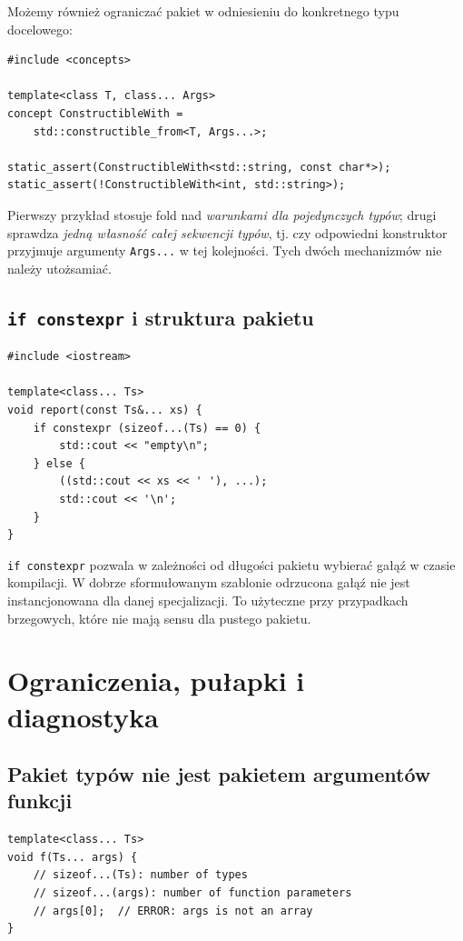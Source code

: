 Możemy również ograniczać pakiet w odniesieniu do
konkretnego typu docelowego:

\begin{lstlisting}
#include <concepts>

template<class T, class... Args>
concept ConstructibleWith =
    std::constructible_from<T, Args...>;

static_assert(ConstructibleWith<std::string, const char*>);
static_assert(!ConstructibleWith<int, std::string>);
\end{lstlisting}

Pierwszy przykład stosuje fold nad \emph{warunkami dla pojedynczych
typów}; drugi sprawdza \emph{jedną własność całej sekwencji
typów}, tj. czy odpowiedni konstruktor przyjmuje argumenty
\texttt{Args...} w tej kolejności. Tych dwóch mechanizmów
nie należy utożsamiać.

\subsection{\texttt{if constexpr} i struktura pakietu}

\begin{lstlisting}
#include <iostream>

template<class... Ts>
void report(const Ts&... xs) {
    if constexpr (sizeof...(Ts) == 0) {
        std::cout << "empty\n";
    } else {
        ((std::cout << xs << ' '), ...);
        std::cout << '\n';
    }
}
\end{lstlisting}

\texttt{if constexpr} pozwala w zależności od długości pakietu
wybierać gałąź w czasie kompilacji. W dobrze sformułowanym
szablonie odrzucona gałąź nie jest instancjonowana dla danej
specjalizacji. To użyteczne przy przypadkach brzegowych,
które nie mają sensu dla pustego pakietu.

\section{Ograniczenia, pułapki i diagnostyka}
\label{sec:variadic-pulapki}

\subsection{Pakiet typów nie jest pakietem argumentów funkcji}

\begin{lstlisting}
template<class... Ts>
void f(Ts... args) {
    // sizeof...(Ts): number of types
    // sizeof...(args): number of function parameters
    // args[0];  // ERROR: args is not an array
}
\end{lstlisting}

